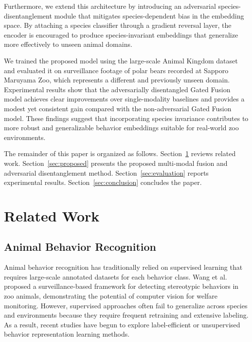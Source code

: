 \documentclass[fleqn,10pt,twocolumn]{AROB}
\begin{document}
Furthermore, we extend this architecture by introducing an adversarial species-disentanglement module that mitigates species-dependent bias in the embedding space. By attaching a species classifier through a gradient reversal layer, the encoder is encouraged to produce species-invariant embeddings that generalize more effectively to unseen animal domains.

We trained the proposed model using the large-scale Animal Kingdom dataset~\cite{animalkingdom} and evaluated it on surveillance footage of polar bears recorded at Sapporo Maruyama Zoo, which represents a different and previously unseen domain. Experimental results show that the adversarially disentangled Gated Fusion model achieves clear improvements over single-modality baselines and provides a modest yet consistent gain compared with the non-adversarial Gated Fusion model. These findings suggest that incorporating species invariance contributes to more robust and generalizable behavior embeddings suitable for real-world zoo environments.

The remainder of this paper is organized as follows.
Section~\ref{sec:related_work} reviews related work.
Section~\ref{sec:proposed} presents the proposed multi-modal fusion and adversarial disentanglement method.
Section~\ref{sec:evaluation} reports experimental results.
Section~\ref{sec:conclusion} concludes the paper.

\section{Related Work}\label{sec:related_work}
\subsection{Animal Behavior Recognition}
Animal behavior recognition has traditionally relied on supervised learning that requires large-scale annotated datasets for each behavior class. Wang et al.~\cite{wang} proposed a surveillance-based framework for detecting stereotypic behaviors in zoo animals, demonstrating the potential of computer vision for welfare monitoring. However, supervised approaches often fail to generalize across species and environments because they require frequent retraining and extensive labeling. As a result, recent studies have begun to explore label-efficient or unsupervised behavior representation learning methods.
\end{document}
